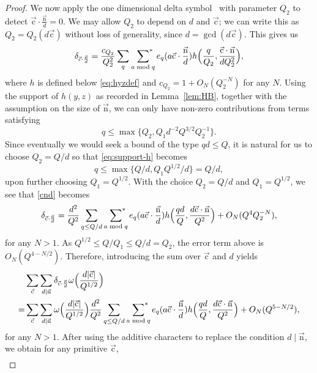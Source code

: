 \documentclass[letterpaper,11pt]{amsart}
\numberwithin{equation}{section}
\theoremstyle{definition}
\numberwithin{equation}{section}
\newcommand{\starsum}{\sideset{}{^*}\sum}
\newcommand{\uc}{{\vec{\mathrm{c}}}}
\newcommand{\nn}{\vec{\mathrm{n}}}
\begin{document}
\begin{proof}
    We now apply the one dimensional delta symbol~\cite[Theorem 1]{Heath-Brown96} with parameter $Q_2$ to detect $\uc\cdot \frac{\nn}{d}=0$. We may allow $Q_2$ to depend on $d$  and $\uc$;  we can write this as $Q_2=Q_2(d\uc)$ without loss of generality, since $d=\gcd(d\uc)$.
    This gives us 
	\begin{align}\label{cnd}
	\delta_{\uc \cdot \frac{\nn}{d}}=  \frac{c_{Q_2}}{Q_2^2}\sum_{q}\ \starsum_{a\bmod q}e_q(a\uc\cdot \frac{\nn}{d})h\Big(\frac{q}{Q_2},\frac{\uc\cdot\nn}{dQ_2^2} \Big),
	\end{align}
	where $h$ is defined below \eqref{eq:hyzdef} and 
	$c_{Q_2}=1+O_N(Q_2^{-N})$ for any $N$. Using the support of $h(y,z)$ as recorded in Lemma~\ref{lem:HB}, together with the assumption on the size of $\nn$, we can only have non-zero contributions from terms satisfying
    \begin{equation}
        \label{eq:support-h}
    q\leq \max\{ Q_2, {Q_1 d^{-2} Q^{3/2}}{Q_2^{-1}}\}.
    \end{equation}
    Since eventually we would seek a bound of the type $qd\leq Q$, it is natural for us to choose $Q_2=Q/d$ so that \eqref{eq:support-h} becomes
       \begin{equation*}
    q\leq \max\{ Q/d, Q_1 Q^{1/2}/d\}=Q/d,
    \end{equation*}
    upon further choosing $Q_1=Q^{1/2}$.
   With the choice $Q_2=Q/d$ and $Q_1=Q^{1/2}$, we see that \eqref{cnd} becomes
    \begin{align*}
	\delta_{\uc \cdot \frac{\nn}{d}}=  \frac{d^2}{Q^2}\sum_{q\leq Q/d}\ \starsum_{a\bmod q}e_q(a\uc\cdot \frac{\nn}{d})h\Big(\frac{qd}{Q},\frac{d\uc\cdot\nn}{Q^2} \Big)+O_N( Q^4 Q_2^{-N}),
	\end{align*} for any $N>1$. As $Q^{1/2}\leq Q/Q_1\leq Q/d=Q_2$, the error term above is $O_N(Q^{4-N/2})$. Therefore, introducing the sum over $\uc$ and $d$ yields
 \begin{align*}
	 &\sum_{\uc}\sum_{d\mid \nn}\delta_{\uc \cdot \frac{\nn}{d}}\omega\Big(\frac{d|\uc|}{Q^{1/2}}\Big)\\=&  \sum_{\uc}\sum_{d\mid \nn}\omega\Big(\frac{d|\uc|}{Q^{1/2}}\Big)\frac{d^2}{Q^2}\sum_{q\leq Q/d}\ \starsum_{a\bmod q}e_q(a\uc\cdot \frac{\nn}{d})h\Big(\frac{qd}{Q},\frac{d\uc\cdot\nn}{Q^2} \Big)+O_N(Q^{5-N/2}),
	\end{align*}
	for any $N>1$. After using the additive characters to replace the condition $d\mid \nn$, we obtain for any primitive $\uc$,
	\begin{align*}

\end{align*}
\end{proof}
\end{document}
